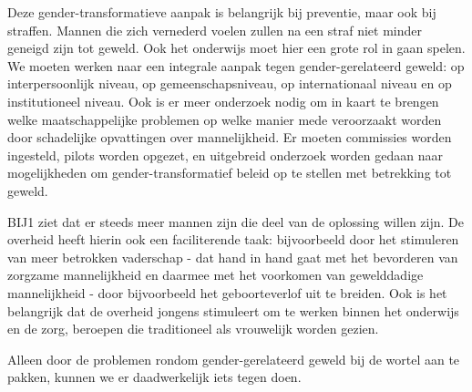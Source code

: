 Deze gender-transformatieve aanpak is belangrijk bij preventie, maar ook
bij straffen. Mannen die zich vernederd voelen zullen na een straf niet
minder geneigd zijn tot geweld. Ook het onderwijs moet hier een grote
rol in gaan spelen. We moeten werken naar een integrale aanpak tegen
gender-gerelateerd geweld: op interpersoonlijk niveau, op
gemeenschapsniveau, op internationaal niveau en op institutioneel
niveau. Ook is er meer onderzoek nodig om in kaart te brengen welke
maatschappelijke problemen op welke manier mede veroorzaakt worden door
schadelijke opvattingen over mannelijkheid. Er moeten commissies worden
ingesteld, pilots worden opgezet, en uitgebreid onderzoek worden gedaan
naar mogelijkheden om gender-transformatief beleid op te stellen met
betrekking tot geweld.

BIJ1 ziet dat er steeds meer mannen zijn die deel van de oplossing
willen zijn. De overheid heeft hierin ook een faciliterende taak:
bijvoorbeeld door het stimuleren van meer betrokken vaderschap - dat
hand in hand gaat met het bevorderen van zorgzame mannelijkheid en
daarmee met het voorkomen van gewelddadige mannelijkheid - door
bijvoorbeeld het geboorteverlof uit te breiden. Ook is het belangrijk
dat de overheid jongens stimuleert om te werken binnen het onderwijs en
de zorg, beroepen die traditioneel als vrouwelijk worden gezien.

Alleen door de problemen rondom gender-gerelateerd geweld bij de wortel
aan te pakken, kunnen we er daadwerkelijk iets tegen doen.
